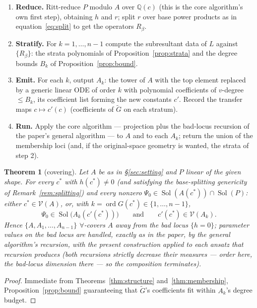 \documentclass[11pt]{article}
\newcommand{\Var}{\mathcal{V}}
\DeclareMathOperator{\Sol}{Sol}
\DeclareMathOperator{\ord}{ord}
\newtheorem{theorem}{Theorem}
\begin{document}
\begin{enumerate}
\item \textbf{Reduce.} Ritt-reduce $P$ modulo $A$ over $\mathbb{Q}(c)$
      (this is the core algorithm's own first step), obtaining $h$ and $r$;
      split $r$ over base power products as in
      equation~\eqref{eq:split} to get the operators $R_\beta$.
\item \textbf{Stratify.} For $k = 1, \dots, n-1$ compute the subresultant
      data of $L$ against $\{R_\beta\}$: the strata polynomials of
      Proposition~\ref{prop:strata} and the degree bounds $B_k$ of
      Proposition~\ref{prop:bound}.
\item \textbf{Emit.} For each $k$, output $A_k$: the tower of $A$ with the
      top element replaced by a generic linear ODE of order $k$ with
      polynomial coefficients of $v$-degree $\le B_k$, its coefficient list
      forming the new constants $c'$. Record the transfer maps
      $c \mapsto c'(c)$ (coefficients of $\widetilde{G}$ on each stratum).
\item \textbf{Run.} Apply the core algorithm --- projection plus the
      bad-locus recursion of the paper's general algorithm --- to $A$ and to
      each $A_k$; return the union of the membership loci (and, if the
      original-space geometry is wanted, the strata of step 2).
\end{enumerate}

\begin{theorem}[covering]
\label{thm:covering}
Let $A$ be as in \S\ref{sec:setting} and $P$ linear of the given shape. For
every $c^*$ with $h(c^*) \neq 0$ (and satisfying the base-splitting
genericity of Remark~\ref{rem:splitting}) and every nonzero
$\Psi_0 \in \Sol(A(c^*)) \cap \Sol(P)$: either $c^* \in \Var(A)$, or,
with $k = \ord G(c^*) \in \{1, \dots, n-1\}$,
\[
\Psi_0 \in \Sol\big(A_k(c'(c^*))\big)
\qquad\text{and}\qquad
c'(c^*) \in \Var(A_k).
\]
Hence $\{A, A_1, \dots, A_{n-1}\}$ $\forall$-covers $A$ away from the bad
locus $\{h = 0\}$; parameter values on the bad locus are handled, exactly as
in the paper, by the general algorithm's recursion, with the present
construction applied to each ansatz that recursion produces (both recursions
strictly decrease their measures --- order here, the bad-locus dimension
there --- so the composition terminates).
\end{theorem}

\begin{proof}
Immediate from Theorems~\ref{thm:structure} and~\ref{thm:membership},
Proposition~\ref{prop:bound} guaranteeing that $\widetilde{G}$'s coefficients
fit within $A_k$'s degree budget.
\end{proof}
\end{document}
